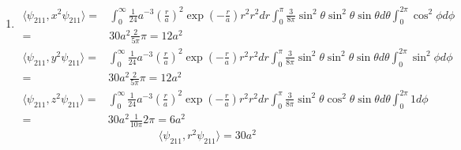 \begin{enumerate}
\begin{enumerate}
\begin{align*}
        \int_0^\infty 
        \dots
        dr\int_0^\pi \dots d\theta 
        \int_0^{2\pi}
        \sin^2\phi 
        e^{-i\phi} d\phi
        =0
    \end{align*}
    \begin{align*}
        \langle\psi_{21-1},z^2\psi_{200}\rangle=&
        \int_0^\infty 
        \dots
        dr\int_0^\pi \dots d\theta 
        \int_0^{2\pi}
        e^{-i\phi} d\phi
        =0
    \end{align*}
    $$
    \langle\psi_{21-1},r^2\psi_{200}\rangle=0
    $$
    \item 
    \begin{align*}
        \langle\psi_{211},x^2\psi_{211}\rangle=&
        \int_0^\infty 
        \frac{1}{24}
        a^{-3}
        \left(\frac{r}{a}\right)^2
        \exp(-\frac{r}{a})r^2r^2dr
        \int_0^\pi 
        \frac{3}{8\pi}
        \sin^2\theta 
        \sin^2\theta 
        \sin\theta d\theta 
        \int_0^{2\pi}
        \cos^2\phi 
         d\phi\\
        =&30a^2\frac{2}{5\pi}\pi = 12a^2
    \end{align*}
    \begin{align*}
        \langle\psi_{211},y^2\psi_{211}\rangle=&
        \int_0^\infty 
        \frac{1}{24}
        a^{-3}
        \left(\frac{r}{a}\right)^2
        \exp(-\frac{r}{a})r^2r^2dr
        \int_0^\pi 
        \frac{3}{8\pi}
        \sin^2\theta 
        \sin^2\theta 
        \sin\theta d\theta 
        \int_0^{2\pi}
        \sin^2\phi 
         d\phi\\
        =&30a^2\frac{2}{5\pi}\pi = 12a^2
    \end{align*}
    \begin{align*}
        \langle\psi_{211},z^2\psi_{211}\rangle=&
        \int_0^\infty 
        \frac{1}{24}
        a^{-3}
        \left(\frac{r}{a}\right)^2
        \exp(-\frac{r}{a})r^2r^2dr
        \int_0^\pi 
        \frac{3}{8\pi}
        \sin^2\theta 
        \cos^2\theta 
        \sin\theta d\theta 
        \int_0^{2\pi}
        1
         d\phi\\
        =&30a^2\frac{1}{10\pi}2\pi = 6a^2
    \end{align*}
    $$
    \langle\psi_{211},r^2\psi_{211}\rangle=30a^2
    $$


\end{enumerate}
\end{enumerate}
